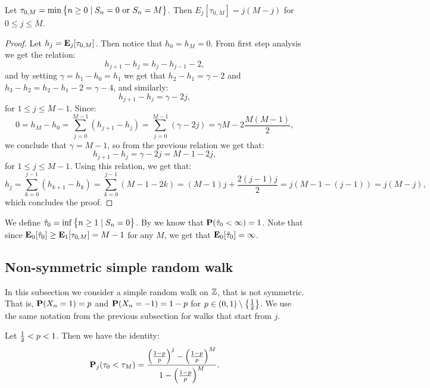 \documentclass[11pt,a4paper]{article}
\begin{document}
\begin{proposition}
  Let $\tau_{0,M} = \min\left\{n \geq 0 \mid S_n = 0 \text{ or } S_n = M\right\}$.
  Then $E_j[\tau_{0,M}] = j(M - j)$
  for $0 \le j \le M$.
\end{proposition}
\begin{proof}
  Let $h_j = \mathbf{E}_j[\tau_{0,M}]$.
  Then notice that $h_0 = h_M = 0$.
  From first step analysis we get the relation:
  \[
    h_{j+1} - h_j = h_j - h_{j-1} - 2,
  \]
  and by setting $\gamma = h_1 - h_0 = h_1$ we get
  that $h_2 - h_1 = \gamma - 2$ and $h_3 - h_2 = h_2 - h_1 - 2 = \gamma - 4$,
  and similarly:
  \[
    h_{j+1} - h_j = \gamma - 2j,
  \]
  for $1 \le j \le M - 1$.
  Since:
  \[
    0 = h_M - h_0 =
    \sum_{j=0}^{M-1} (h_{j+1} - h_j) =
    \sum_{j=0}^{M-1} (\gamma - 2j) =
    \gamma M - 2 \frac{M (M - 1)}{2},
  \]
  we conclude that $\gamma = M - 1$,
  so from the previous relation we get that:
  \[
    h_{j+1} - h_j = \gamma - 2j = M - 1 - 2j,
  \]
  for $1 \le j \le M - 1$.
  Using this relation, we get that:
  \[
    h_j =
    \sum_{k=0}^{j-1} (h_{k+1} - h_k) =
    \sum_{k=0}^{j-1} (M - 1 - 2k) =
    (M - 1)j + \frac{2(j - 1)j}{2} =
    j(M - 1 - (j - 1)) = j(M - j),
  \]
  which concludes the proof.
\end{proof}

\begin{remark}
  We define $\hat \tau_0 = \inf\left\{n \geq 1 \mid S_n = 0\right\}$.
  By  we know that
  $\mathbf{P}(\hat \tau_0 < \infty) = 1$.
  Note that since $\mathbf{E}_0[\hat \tau_0] \geq \mathbf{E}_1[\tau_{0,M}] = M - 1$
  for any $M$, we get that $\mathbf{E}_0[\hat \tau_0] = \infty$.
\end{remark}

\subsection{Non-symmetric simple random walk}
In this subsection we consider a simple random walk on $\mathbb{Z}$,
that is not symmetric.
That is, $\mathbf{P}(X_n = 1) = p$ and $\mathbf{P}(X_{n} = -1) = 1 - p$
for $p \in (0,1) \setminus \left\{\frac{1}{2}\right\}$.
We use the same notation from the previous subsection
for walks that start from $j$.

\begin{proposition}
  \label{prop:SARW}
  Let $\frac{1}{2} < p < 1$.
  Then we have the identity:
  \[
    \Prob_j(\tau_0 < \tau_M) =
    \frac{\del{\frac{1 - p}{p}}^j - \del{\frac{1 - p}{p}}^M}
    {1 - \del{\frac{1 - p}{p}}^M}.
  \]
\end{proposition}
\end{document}
